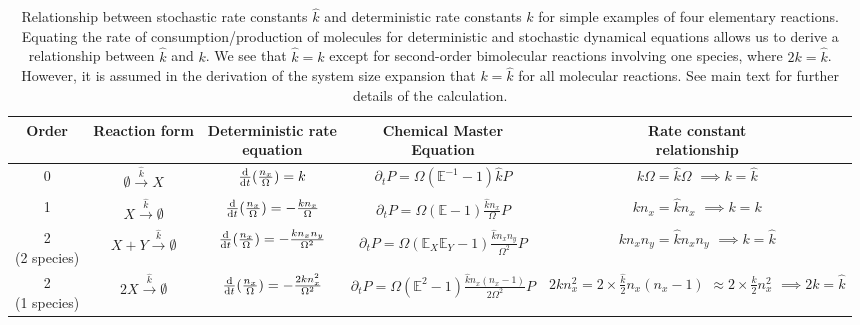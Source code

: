 \documentclass[10pt,letterpaper]{article}
\begin{document}
\begin{table}
\centering
\caption{Relationship between stochastic rate constants $\hat{k}$ and deterministic rate constants $k$ for simple examples of four elementary reactions. Equating the rate of consumption/production of molecules for deterministic and stochastic dynamical equations\cite{Wilkinson11} allows us to derive a relationship between $\hat{k}$ and $k$. We see that $\hat{k}=k$ except for second-order bimolecular reactions involving one species, where $2k = \hat{k}$. However, it is assumed in the derivation of the system size expansion that $k=\hat{k}$ for all molecular reactions. See main text for further details of the calculation.}
\label{table:rel_stoch_det_const}
\begin{tabular}{c|c|c|c|c}
Order & Reaction form & \thead{Deterministic rate \\equation} & \thead{Chemical Master \\Equation} & \thead{Rate constant\\ relationship} \\ \hline
  0    & $\emptyset\xrightarrow{\hat{k}} X$ & $\frac{\text{d}}{\text{d}t}(\frac{n_x}{\Omega})=k$ & $\partial_t P = \Omega (\mathbb{E}^{-1}-1)\hat{k} P$ & \makecell{$k \Omega = \hat{k} \Omega$\\$\implies k=\hat{k}$ }               \\ \hline
  1   &  $X\xrightarrow{\hat{k}} \emptyset$ & $\frac{\text{d}}{\text{d}t}(\frac{n_x}{\Omega})=-\frac{k n_x}{\Omega}$ & $\partial_t P = \Omega (\mathbb{E}-1)\frac{\hat{k}n_x}{\Omega} P$ & \makecell{$kn_x=\hat{k}n_x$\\$\implies k=k$ }               \\ \hline
  \makecell{2\\(2 species)}   &$X+Y\xrightarrow{\hat{k}} \emptyset$ & $\frac{\text{d}}{\text{d}t}(\frac{n_x}{\Omega})=-\frac{kn_x n_y}{\Omega^2}$ & $\partial_t P = \Omega(\mathbb{E}_X\mathbb{E}_Y - 1)\frac{\hat{k}n_x n_y}{\Omega^2}P$& \makecell{$kn_xn_y = \hat{k}n_xn_y$\\$\implies k=\hat{k}$ }  \\ \hline
 \makecell{2\\(1 species)}   &$2X\xrightarrow{\hat{k}} \emptyset$ & $\frac{\text{d}}{\text{d}t}(\frac{n_x}{\Omega})=-\frac{2kn_x^2}{\Omega^2}$ & $\partial_t P = \Omega(\mathbb{E}^2 - 1)\frac{\hat{k}n_x(n_x-1)}{2\Omega^2}P$& \makecell{$2kn_x^2 = 2 \times \frac{\hat{k}}{2}n_x(n_x-1)$\\$\approx 2 \times \frac{\hat{k}}{2}n_x^2$ \\ $\implies 2k = \hat{k}$ }
\end{tabular}
\end{table}
\end{document}
